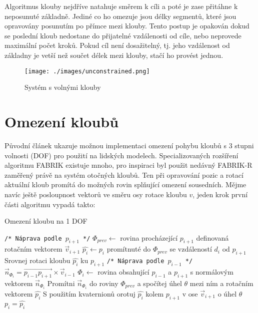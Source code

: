 \documentclass[czech]{pyt-report}
\begin{document}
Algoritmus klouby nejdříve natahuje směrem k cíli a poté je zase přitáhne k neposunuté základně. Jediné co ho omezuje jsou délky segmentů, které jsou opravovány posunutím po přímce mezi klouby. Tento postup je opakován dokud se poslední kloub nedostane do přijatelné vzdálenosti od cíle, nebo neprovede maximální počet kroků. Pokud cíl není dosažitelný, tj. jeho vzdálenost od základny je vetší než součet délek mezi klouby, stačí ho provést jednou.

\begin{figure}[h]
  \centering\leavevmode
  \texttt{[image: ./images/unconstrained.png]}\vskip-0.5cm
  \medskip
  \caption{Systém s volnými klouby}
  \label{fig:non-constrained-system}
\end{figure}

\section{Omezení kloubů}
\label{sec:omezeni}
Původní článek ukazuje možnou implementaci omezení pohybu kloubů s 3 stupni volnosti (DOF) pro použití na lidských modelech. Specializovaných rozšíření algoritmu FABRIK existuje mnoho, pro inspiraci byl použit nedávný FABRIK-R\cite{bib:fabrik-r} zaměřený právě na systém otočných kloubů. Ten při opravování pozic a rotací aktuální kloub promítá do možných rovin splňující omezení sousedních. Mějme navíc ještě posloupnost vektorů ve směru osy rotace kloubu $v$, jeden krok první části algoritmu vypadá takto:

\begin{algorithm}[H]
\caption{Omezení kloubu na 1 DOF}\label{alg:1dof}
\begin{algorithmic}[1]
\Statex \texttt{/* Náprava podle $p_{i+1}$ */}
\State $\Phi_{prev} \gets$ rovina procházející $p_{i+1}$ definovaná rotačním vektorem $\vec{v}_{i+1}$
\State $\hat{p_i} \gets p_i$ promítnuté do $\Phi_{prev}$ se vzdáleností $d_i$ od $p_{i+1}$
\State Srovnej rotaci kloubu $\hat{p_i}$ ku $p_{i+1}$
\Statex
\Statex \texttt{/* Náprava podle $p_{i-1}$ */}
\State $\vec{n}_{\Phi_i} = \overrightarrow{p_{i-1}p_{i+1}} \times \vec{v}_{i-1}$
\State $\Phi_{i} \gets$ rovina obsahující $p_{i-1}$ a $p_{i+1}$ s normálovým vektorem $\vec{n}_{\Phi_i}$ 
\State Promítni $\vec{n}_{\Phi_i}$ do roviny $\Phi_{prev}$ a spočítej úhel $\theta$ mezi ním a rotačním vektorem $\hat{p_i}$
\State S použitím kvaternionů orotuj $\hat{p_i}$ kolem $p_{i+1}$ v ose $\vec{v}_{i+1}$ o úhel $\theta$
\State $p_i = \hat{p_i}$
\end{algorithmic}
\end{algorithm}
\end{document}
